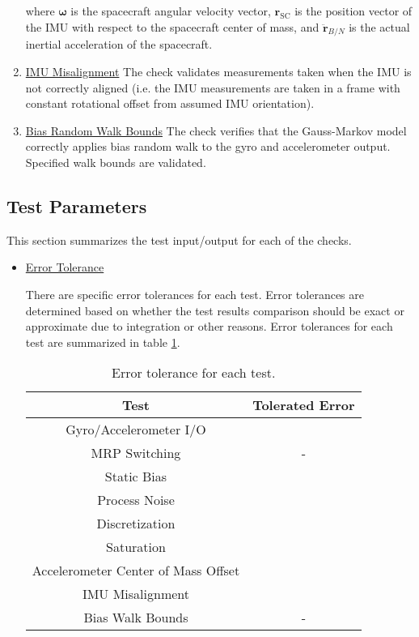 \documentclass[]{BasiliskReportMemo}
\begin{document}
\begin{enumerate}
	where $\bm\omega$ is the spacecraft angular velocity vector, $\bm r_{\mathrm{SC}}$ is the position vector of the IMU with respect to the spacecraft center of mass, and $ \ddot{\bm r}_{B/N}$ is the actual inertial acceleration of the spacecraft.
	\item \underline{IMU Misalignment} The check validates measurements taken when the IMU is not correctly aligned (i.e. the IMU measurements are taken in a frame with constant rotational offset from assumed IMU orientation).
	\item \underline{Bias Random Walk Bounds} The check verifies that the Gauss-Markov model correctly applies bias random walk to the gyro and accelerometer output. Specified walk bounds are validated.
\end{enumerate} 

\subsection{Test Parameters}

This section summarizes the test input/output for each of the checks. 
\begin{itemize}
\item \underline{Error Tolerance}

There are specific error tolerances for each test. Error tolerances are determined based on whether the test results comparison should be exact or approximate due to integration or other reasons. Error tolerances for each test are summarized in table \ref{tab:errortol}. 

\begin{table}[H]
	\caption{Error tolerance for each test.}
	\label{tab:errortol}
	\centering \fontsize{10}{10}\selectfont
	\begin{tabular}{ c | c } %
		\hline
		\textbf{Test}   									& \textbf{Tolerated Error} 						  \\ \hline
		Gyro/Accelerometer I/O 						& 		   \\ \hline
		MRP Switching 									& - 														   \\ \hline
		Static Bias 										&  	 		       \\ \hline
		Process Noise 									& 			      \\ \hline
		Discretization 				  					   &   \\ \hline
		Saturation 											&  	  \\ \hline
		Accelerometer Center of Mass Offset &  \\ \hline
		IMU Misalignment 								&  \\ \hline
		Bias Walk Bounds 								& - 														   \\ \hline
	\end{tabular}
\end{table}
\end{itemize}
\end{document}
